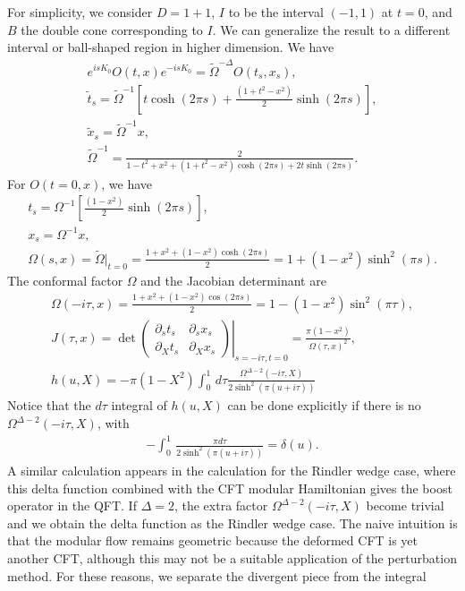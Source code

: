 \documentclass[a4paper,11pt]{article}
\theoremstyle{definition}
\begin{document}
For simplicity, we consider $D = 1+1$, $I$ to be the interval $(-1,1)$ at $t = 0$, and $B$ the double cone corresponding to $I$. We can generalize the result to a different interval or ball-shaped region in higher dimension. We have 
\begin{gather}
    e^{isK_0} O(t,x) e^{-isK_0} = \tilde{\Omega}^{-\Delta} O(t_s,x_s), \\
    \tilde{t}_s = \tilde{\Omega}^{-1}\left[t \cosh(2\pi s) + \frac{(1+t^2-x^2)}{2}\sinh(2\pi s) \right],\\
    \tilde{x}_s = \tilde{\Omega}^{-1}x, \\
   \tilde {\Omega}^{-1} = \frac{2}{1-t^2+x^2+(1+t^2-x^2)\cosh(2\pi s) + 2t \sinh(2\pi s)}.
\end{gather}
For $O(t=0,x)$, we have
\begin{gather}
    t_s = {\Omega}^{-1}\left[\frac{(1-x^2)}{2}\sinh(2\pi s) \right],\\
    x_s = {\Omega}^{-1}x, \\
    {\Omega}(s,x) = \tilde{\Omega}|_{t=0}= \frac{1+x^2+(1-x^2)\cosh(2\pi s)}{2} = 1+(1-x^2)\sinh^2(\pi s).
\end{gather}
The conformal factor $\Omega$ and the Jacobian determinant are
\begin{gather}
    \Omega(-i\tau,x)= \frac{1+x^2+(1-x^2)\cos(2\pi s)}{2} =1-(1-x^2)\sin^2(\pi \tau),\\
    J(\tau,x) = \det \left.\begin{pmatrix}
        \partial_st_{s} & \partial_s x_{s}\\  \partial_X t_{s}& \partial_X x_{s}
    \end{pmatrix}\right|_{s=-i\tau, t =0} =\frac{\pi (1-x^2)}{\Omega(\tau,x)^2},\\
    h(u,X) = -\pi(1-X^2)\int_0^1\, d\tau \frac{\Omega^{\Delta-2}(-i\tau,X)}{2\sinh^2(\pi (u+i\tau))}
\end{gather}
Notice that the $d\tau$ integral of $h(u,X)$ can be done explicitly if there is no $\Omega^{\Delta-2}(-i\tau,X)$, with
\begin{align}
    -\int_0^1\, \frac{ \pi d\tau }{2\sinh^2(\pi (u+i\tau))} = \delta(u).
\end{align}
A similar calculation appears in the calculation for the Rindler wedge case, where this delta function combined with the CFT modular Hamiltonian gives the boost operator in the QFT. If $\Delta = 2$, the extra factor $\Omega^{\Delta-2}(-i\tau,X)$ become trivial and we obtain the delta function as the Rindler wedge case. The naive intuition is that the modular flow remains geometric because the deformed CFT is yet another CFT, although this may not be a suitable application of the perturbation method. For these reasons, we separate the divergent piece from the integral
\end{document}
